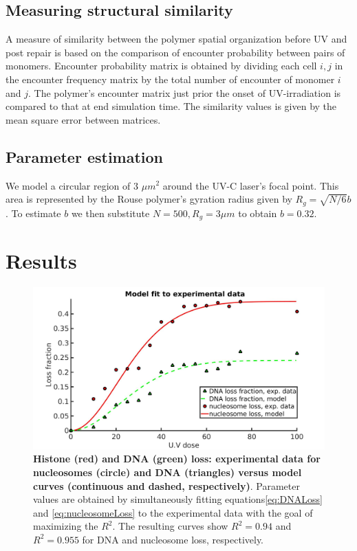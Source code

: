 \documentclass[12pt]{article}
\begin{document}
	\subsection{Measuring structural similarity}
	A measure of similarity between the polymer spatial organization before UV and post repair is based on the comparison of encounter probability between pairs of monomers.  Encounter probability matrix is obtained by dividing each cell $i,j$ in the encounter frequency matrix by the total number of encounter of monomer $i$ and $j$. The polymer's encounter matrix just prior the onset of UV-irradiation is compared to that at end simulation time. The similarity values is given by the mean square error between matrices. 
	
	\subsection{Parameter estimation}
	We model a circular region of 3 $\mu m^2$ around the UV-C laser's focal point. This area is represented by the Rouse polymer's gyration radius given by $R_g= \sqrt{N/6}b$. To estimate $b$ we then substitute $N=500, R_g=3\mu m$ to obtain $b=0.32$. 
	
	\section{Results}

	\begin{figure}[H]
	\centering
	\includegraphics[width=0.5\linewidth, height=0.3\textheight]{histoneAndDnaVsUvDoseModelFit}
	\caption{\textbf{Histone (red) and DNA (green) loss: experimental data
		for nucleosomes (circle) and DNA (triangles) versus model curves
		(continuous and dashed, respectively)}. Parameter values are obtained
		by simultaneously fitting equations\eqref{eq:DNALoss}  and \eqref{eq:nucleosomeLoss} to the experimental data with
		the goal of maximizing the $R^2$. The resulting curves show $R^2 = 0.94$ and
		$R^2 = 0.955$ for DNA and nucleosome loss, respectively.}
	\label{fig:histoneAndDnaVsUvDoseModelFit}
	\end{figure}
	
\end{document}
